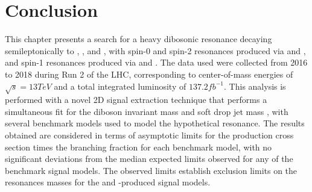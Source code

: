 
\section{Conclusion}
\label{sec:conclusion}

This chapter presents a search for a heavy dibosonic resonance decaying semileptonically to \WW, \WZ, and \WH, with spin-0 and spin-2 resonances produced via \ggF and \VBF, and spin-1 resonances produced via \DY and \VBF.
The data used were collected from 2016 to 2018 during Run 2 of the LHC, corresponding to center-of-mass energies of $\sqrt{s}=13\unit{TeV}$ and a total integrated luminosity of $137.2\unit{fb^{-1}}$.
This analysis is performed with a novel 2D signal extraction technique that performs a simultaneous fit for the diboson invariant mass \MVV and soft drop jet mass \MJ, with several benchmark models used to model the hypothetical resonance.
The results obtained are considered in terms of asymptotic limits for the production cross section times the branching fraction for each benchmark model, with no significant deviations from the median expected limits observed for any of the benchmark signal models.
The observed limits establish exclusion limits on the resonances masses for the \DY and \ggF-produced signal models.
